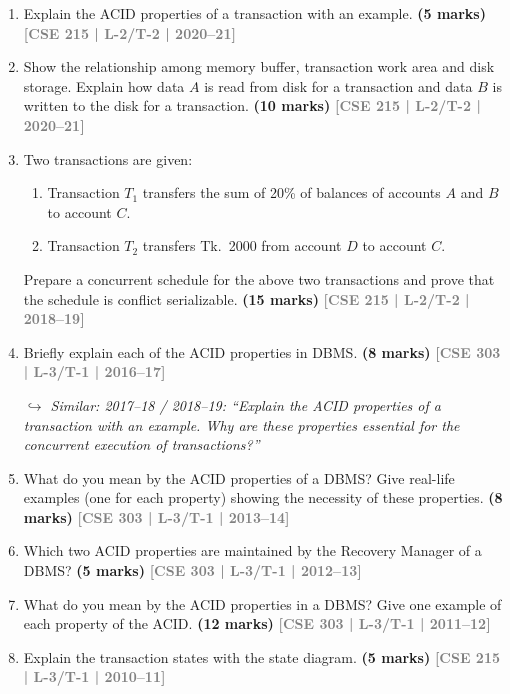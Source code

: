 \documentclass[12pt,a3paper]{article}
\newcommand{\yr}[1]{\hfill\textcolor{gray}{\small\textbf{[#1]}}}
\newcommand{\mk}[1]{\textcolor{orange!70!black}{\small\textbf{(#1 marks)}}}
\newcommand{\variant}[1]{\par\vspace{1pt}\textcolor{blue!50!black}%
  {\footnotesize\textit{$\hookrightarrow$ Similar: #1}}}
\begin{document}
\begin{enumerate}

\item Explain the ACID properties of a transaction with an example.
\mk{5} \yr{CSE 215 | L-2/T-2 | 2020--21}

\item Show the relationship among memory buffer, transaction work area and disk storage. Explain how data $A$ is read from disk for a transaction and data $B$ is written to the disk for a transaction.
\mk{10} \yr{CSE 215 | L-2/T-2 | 2020--21}

\item Two transactions are given:
\begin{enumerate}
  \item Transaction $T_1$ transfers the sum of 20\% of balances of accounts $A$ and $B$ to account $C$.
  \item Transaction $T_2$ transfers Tk.\ 2000 from account $D$ to account $C$.
\end{enumerate}
Prepare a concurrent schedule for the above two transactions and prove that the schedule is conflict serializable.
  \mk{15} \yr{CSE 215 | L-2/T-2 | 2018--19}

\item Briefly explain each of the ACID properties in DBMS.
\mk{8} \yr{CSE 303 | L-3/T-1 | 2016--17}

\variant{2017--18 / 2018--19: ``Explain the ACID properties of a transaction with an example. Why are these properties essential for the concurrent execution of transactions?''}

\item What do you mean by the ACID properties of a DBMS? Give real-life examples (one for each property) showing the necessity of these properties.
\mk{8} \yr{CSE 303 | L-3/T-1 | 2013--14}

\item Which two ACID properties are maintained by the Recovery Manager of a DBMS?
\mk{5} \yr{CSE 303 | L-3/T-1 | 2012--13}

\item What do you mean by the ACID properties in a DBMS? Give one example of each property of the ACID.
\mk{12} \yr{CSE 303 | L-3/T-1 | 2011--12}

\item Explain the transaction states with the state diagram.
\mk{5} \yr{CSE 215 | L-3/T-1 | 2010--11}

\end{enumerate}
\end{document}
